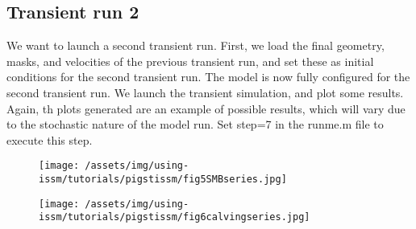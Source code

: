 \subsection{Transient run 2}%
We want to launch a second transient run. First, we load the final geometry, masks, and velocities of the previous transient run, and set these as initial conditions for the second transient run. The model is now fully configured for the second transient run. We launch the transient simulation, and plot some results. Again, th plots generated are an example of possible results, which will vary due to the stochastic nature of the model run.
Set step=7 in the runme.m file to execute this step.
\begin{figure}
	\begin{center}
		\texttt{[image: /assets/img/using-issm/tutorials/pigstissm/fig5SMBseries.jpg]}
	\end{center}
\end{figure}
\begin{figure}
	\begin{center}
		\texttt{[image: /assets/img/using-issm/tutorials/pigstissm/fig6calvingseries.jpg]}
	\end{center}
\end{figure}
